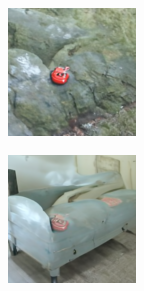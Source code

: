 \documentclass{article}
\begin{document}
\begin{figure}
\begin{subfigure}[b]{0.5\linewidth}
\begin{subfigure}[b]{0.242\linewidth}
        \end{subfigure}
        \hfill
    \end{subfigure}%
    \begin{subfigure}[b]{0.5\linewidth}
        \begin{subfigure}[b]{0.242\linewidth}
        \includegraphics[width=\linewidth]{figures/imagenet128/solver_samples/imagenet128_fm_ot_214_05.png}
        \end{subfigure}
        \begin{subfigure}[b]{0.242\linewidth}
        \includegraphics[width=\linewidth]{figures/imagenet128/solver_samples/imagenet128_fm_ot_214_10.png}

\end{subfigure}
\end{subfigure}
\end{figure}
\end{document}
